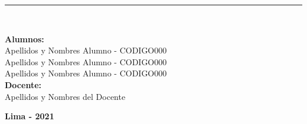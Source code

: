 \begin{titlepage}
\begin{center}
		\rule{\linewidth}{1.5pt}\\
		\vspace{15pt}
		
		\begin{spacing}{1.25}
			{\large \textbf{Alumnos:}}\\
			{\large
			Apellidos y Nombres Alumno - CODIGO000\\
			Apellidos y Nombres Alumno - CODIGO000\\
			Apellidos y Nombres Alumno - CODIGO000\\
			}
			\vspace{15pt}			
			{\large \textbf{Docente:}}\\
			{\large
			Apellidos y Nombres del Docente\\	
			}		
		\end{spacing}
		
		\vfill		
		{\large \textbf{Lima - 2021}}
			
	\end{center}
\end{titlepage}
